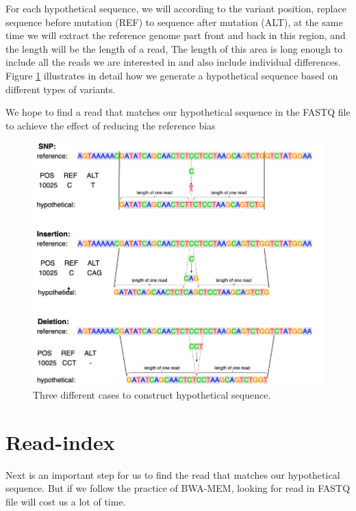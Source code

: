 For each hypothetical sequence, we will according to the variant position, replace sequence before mutation (REF) to sequence after mutation (ALT), at the same time we will extract the reference genome part front and back in this region, and the length will be the length of a read, The length of this area is long enough to include all the reads we are interested in and also include individual differences. Figure  \ref{f3-4} illustrates in detail how we generate a hypothetical sequence based on different types of variants.

We hope to find a read that matches our hypothetical sequence in the FASTQ file to achieve the effect of reducing the reference bias
\vspace{1cm}
\begin{figure}[H]
    \centering
    \includegraphics[width=1\columnwidth]{body/image/3-4.png}
    \captionsetup{labelfont=bf}
    \renewcommand{\baselinestretch}{1.0}
    \vspace{-0.5cm}
    \caption[construct hypothetical sequence]{Three different cases to construct hypothetical sequence.}
    \label{f3-4}
\end{figure}

\section{Read-index}

Next is an important step for us to find the read that matches our hypothetical sequence. But if we follow the practice of BWA-MEM, looking for read in FASTQ file will cost us a lot of time. 

